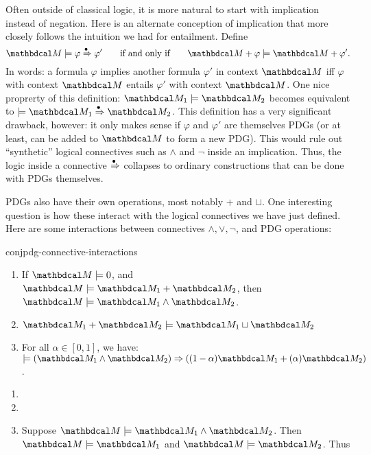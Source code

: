     
\def\entimp{\overset{\smash{\!\!\bullet}}\Rightarrow}
Often outside of classical logic, it is more natural to start with 
    implication instead of negation.
Here is an alternate conception of implication that more closely
    follows the intuition we had for entailment.
Define
\[ \dg M \models \varphi \entimp \varphi' \qquad\text{if and only if}\qquad
    \dg M + \varphi \models \dg M + \varphi'. \] 
In words: a formula $\varphi$ implies another formula $\varphi'$ in context $\dg M$ 
    iff $\varphi$ with context $\dg M$ entails $\varphi'$ with context $\dg M$. 
One nice proprerty of this definition: $\dg M_1 \models \dg M_2$ becomes
    equivalent to $\models \dg M_1 \entimp \dg M_2$.
%
This definition has a very significant drawback, however:
it only makes sense if $\varphi$ and $\varphi'$ are themselves PDGs (or at least,
    can be added to $\dg M$ to form a new PDG). 
This would rule out
    ``synthetic'' logical connectives such as $\land$ and $\lnot$
    inside an implication.
Thus, the logic inside a connective $\entimp$ collapses to ordinary constructions
    that can be done with PDGs themselves. 
        

    
    PDGs also have their own operations, most notably $+$ and $\sqcup$.
    One interesting question is how these interact with the logical connectives we have just defined. 
    Here are some interactions between connectives $\land, \lor, \lnot$, and PDG operations:
    \begin{linked}{conj}{pdg-connective-interactions}
    \begin{enumerate}[parsep=0pt]
        \item If $\dg M \models 0$, and $\dg M \models \dg M_1 + \dg M_2$,
        then $\dg M \models \dg M_1 \land \dg M_2$. 
        \item $\dg M_1 + \dg M_2 \models \dg M_1 \sqcup \dg M_2$ 
        \item   
            For all $\alpha\in [0,1]$, we have:
            $\models (\dg M_1 \land \dg M_2) \Rightarrow ((1-\alpha)\dg M_1 + (\alpha)\dg M_2)$. 
    \end{enumerate}
    \end{linked}
    \begin{lproof}[Exploration]\label{proof:pdg-connective-interactions}
    \begin{enumerate}[parsep=0pt]
        \item 
        \item 
        \item Suppose $\dg M \models \dg M_1 \land \dg M_2$. 
        Then $\dg M \models \dg M_1$ and $\dg M \models \dg M_2$.
        Thus
    \end{enumerate}
    \end{lproof}
    
